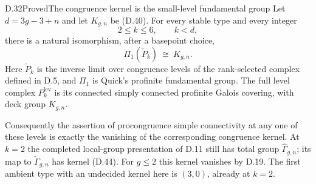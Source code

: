 \begin{result}{D.32}{Proved}{The congruence kernel is the small-level fundamental group}
Let $d=3g-3+n$ and let $K_{g,n}$ be (D.40).  For every
stable type and every integer
\[
                       2\leq k\leq6,\qquad k<d,
\]
there is a natural isomorphism, after a basepoint choice,
\[
        \Pi_1(\check P_k)\ \cong\ K_{g,n}.                  \tag{D.44}
\]
Here $\check P_k$ is the inverse limit over congruence
levels of the rank-selected complex defined in D.5,
and $\Pi_1$ is Quick's profinite fundamental group.
The full level complex $P_k^{\mathrm{lev}}$ is its
connected simply connected profinite Galois covering,
with deck group $K_{g,n}$.

Consequently the assertion of procongruence simple
connectivity at any one of these levels is exactly
the vanishing of the corresponding congruence kernel.
At $k=2$ the completed local-group presentation of
D.11 still has total group $\widehat\Gamma_{g,n}$;
its map to $\check\Gamma_{g,n}$ has kernel (D.44).
For $g\leq2$ this kernel vanishes by D.19.  The first
ambient type with an undecided kernel here is $(3,0)$,
already at $k=2$.
\end{result}
